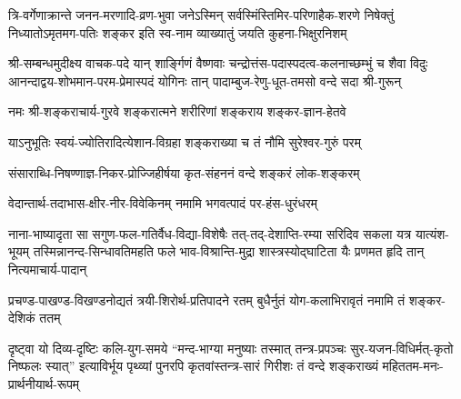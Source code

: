 
\fourlineindentedshloka
{त्रि-वर्गेणाक्रान्ते जनन-मरणादि-व्रण-भुवा}
{जनेऽस्मिन् सर्वस्मिंस्तिमिर-परिणाहैक-शरणे}
{निषेक्तुं निध्यातोऽमृतमग-पतिः शङ्कर इति}
{स्व-नाम व्याख्यातुं जयति कुहना-भिक्षुरनिशम्}


\fourlineindentedshloka
{श्री-सम्बन्धमुदीक्ष्य वाचक-पदे यान् शार्ङ्गिणं वैष्णवाः}
{चन्द्रोत्तंस-पदास्पदत्व-कलनाच्छम्भुं च शैवा विदुः}
{आनन्दाद्वय-शोभमान-परम-प्रेमास्पदं योगिनः}
{तान् पादाम्बुज-रेणु-धूत-तमसो वन्दे सदा श्री-गुरून्}


\twolineshloka
{नमः श्री-शङ्कराचार्य-गुरवे शङ्करात्मने}
{शरीरिणां शङ्कराय शङ्कर-ज्ञान-हेतवे}


\twolineshloka
{याऽनुभूतिः स्वयं-ज्योतिरादित्येशान-विग्रहा}
{शङ्कराख्या च तं नौमि सुरेश्वर-गुरुं परम्}


\twolineshloka
{संसाराब्धि-निषण्णाज्ञ-निकर-प्रोज्जिहीर्षया}
{कृत-संहननं वन्दे शङ्करं लोक-शङ्करम्}


\twolineshloka
{वेदान्तार्थ-तदाभास-क्षीर-नीर-विवेकिनम्}
{नमामि भगवत्पादं पर-हंस-धुरंधरम्}


\fourlineindentedshloka
{नाना-भाष्यादृता सा सगुण-फल-गतिर्वैध-विद्या-विशेषैः}
{तत्-तद्-देशाप्ति-रम्या सरिदिव सकला यत्र यात्यंश-भूयम्}
{तस्मिन्नानन्द-सिन्धावतिमहति फले भाव-विश्रान्ति-मुद्रा}
{शास्त्रस्योद्घाटिता यैः प्रणमत हृदि तान् नित्यमाचार्य-पादान्}


\twolineshloka
{प्रचण्ड-पाखण्ड-विखण्डनोद्यतं त्रयी-शिरोर्थ-प्रतिपादने रतम्}
{बुधैर्नुतं योग-कलाभिरावृतं नमामि तं शङ्कर-देशिकं ततम्}


\fourlineindentedshloka
{दृष्ट्वा यो दिव्य-दृष्टिः कलि-युग-समये “मन्द-भाग्या मनुष्याः}
{तस्मात् तन्त्र-प्रपञ्चः सुर-यजन-विधिर्मत्-कृतो निष्फलः स्यात्”}
{इत्याविर्भूय पृथ्व्यां पुनरपि कृतवांस्तन्त्र-सारं गिरीशः}
{तं वन्दे शङ्कराख्यं महिततम-मनः-प्रार्थनीयार्थ-रूपम्}

